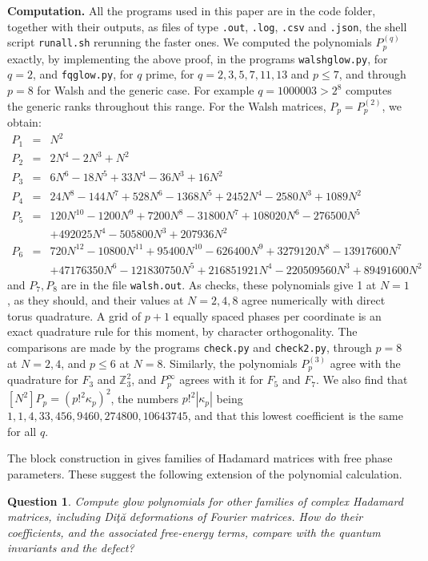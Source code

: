 \documentclass[11pt,a4paper]{article}
\newtheorem{question}[thm]{Question}
\theoremstyle{remark}
\begin{document}
\noindent\textbf{Computation.} All the programs used in this paper are in the code folder, together with their outputs, as files of type \texttt{.out}, \texttt{.log}, \texttt{.csv} and \texttt{.json}, the shell script \texttt{runall.sh} rerunning the faster ones. We computed the polynomials $P^{(q)}_p$ exactly, by implementing the above proof, in the programs \texttt{walshglow.py}, for $q=2$, and \texttt{fqglow.py}, for $q$ prime, for $q=2,3,5,7,11,13$ and $p\leq7$, and through $p=8$ for Walsh and the generic case. For example $q=1000003>2^8$ computes the generic ranks throughout this range. For the Walsh matrices, $P_p=P^{(2)}_p$, we obtain:
\begin{eqnarray*}
P_1&=&N^2\\
P_2&=&2N^4-2N^3+N^2\\
P_3&=&6N^6-18N^5+33N^4-36N^3+16N^2\\
P_4&=&24N^8-144N^7+528N^6-1368N^5+2452N^4-2580N^3+1089N^2\\
P_5&=&120N^{10}-1200N^9+7200N^8-31800N^7+108020N^6-276500N^5\\
&&+492025N^4-505800N^3+207936N^2\\
P_6&=&720N^{12}-10800N^{11}+95400N^{10}-626400N^9+3279120N^8-13917600N^7\\
&&+47176350N^6-121830750N^5+216851921N^4-220509560N^3+89491600N^2
\end{eqnarray*}
and $P_7,P_8$ are in the file \texttt{walsh.out}. As checks, these polynomials give 1 at $N=1$, as they should, and their values at $N=2,4,8$ agree numerically with direct torus quadrature. A grid of $p+1$ equally spaced phases per coordinate is an exact quadrature rule for this moment, by character orthogonality. The comparisons are made by the programs \texttt{check.py} and \texttt{check2.py}, through $p=8$ at $N=2,4$, and $p\leq6$ at $N=8$. Similarly, the polynomials $P^{(3)}_p$ agree with the quadrature for $F_3$ and $\mathbb Z_3^2$, and $P^\infty_p$ agrees with it for $F_5$ and $F_7$. We also find that $[N^2]P_p=(p!^2\kappa_p)^2$, the numbers $p!^2|\kappa_p|$ being $1,1,4,33,456,9460,274800,10643745$, and that this lowest coefficient is the same for all $q$.


The block construction in \cite{dita} gives families of Hadamard matrices
with free phase parameters. These suggest the following extension of the polynomial calculation.

\begin{samepage}
\begin{question}\label{que:families}
Compute glow polynomials for other families of complex Hadamard matrices, including Di\c t\u a deformations of Fourier matrices. How do their coefficients, and the associated free-energy terms, compare with the quantum invariants and the defect?
\end{question}
\end{samepage}
\end{document}
